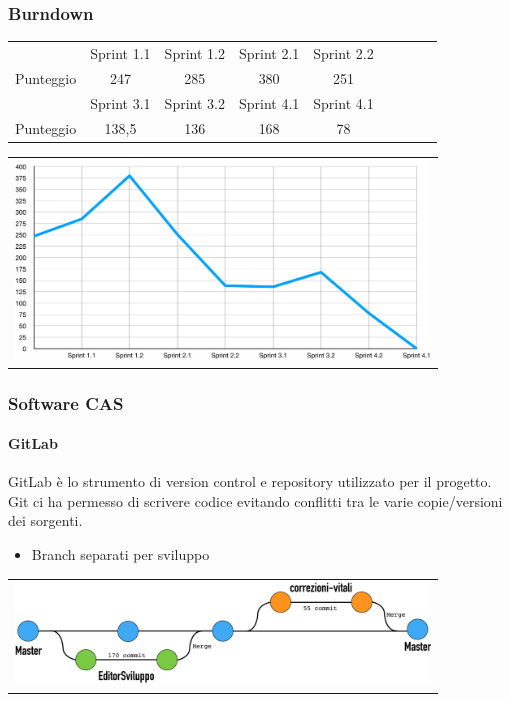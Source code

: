 \documentclass{beamer}
\begin{document}
\begin{frame}
\frametitle{Burndown}
\centering
\begin{tabular}{|c|c|c|c|c|c|c|c|c|}
\hline
					& Sprint 1.1	& Sprint 1.2	&Sprint 2.1	&Sprint 2.2	\\
Punteggio		& 247			& 285			& 380			& 251			\\
\hline
					&Sprint 3.1	&Sprint 3.2	&Sprint 4.1	&Sprint 4.1    \\
Punteggio 	& 138,5			& 136			& 168			& 78 			 	 \\
\hline
\end{tabular}
 \centering
        \begin{tabular}{c}
        \includegraphics[width=11cm]{burndown/burndown_slides.png}
      \end{tabular}
\end{frame}

\begin{frame}
\frametitle{Software CAS}
\framesubtitle{GitLab}
GitLab è lo strumento di version control e repository utilizzato per il progetto.\\
Git ci ha permesso di scrivere codice evitando conflitti tra le varie copie/versioni dei sorgenti.
  \begin{itemize}
	\item Branch separati per sviluppo
  \end{itemize}
      \centering
        \begin{tabular}{c}
        \includegraphics[width=11cm]{Images/GitLab/branches2}
      \end{tabular}
\end{frame}
\end{document}
